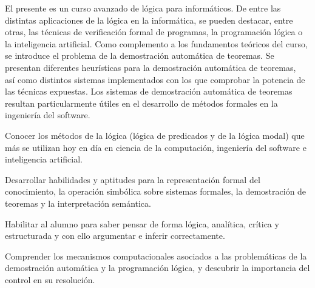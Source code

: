 \begin{syllabus}


\begin{justification}
El presente es un curso avanzado de lógica para informáticos. De
entre las distintas aplicaciones de la lógica en la informática, se
pueden destacar, entre otras, las técnicas de verificación formal de
programas, la programación lógica o la inteligencia artificial. Como
complemento a los fundamentos teóricos del curso, se introduce el
problema de la demostración automática de teoremas. Se presentan
diferentes heurísticas para la demostración automática de teoremas,
así­ como distintos sistemas implementados con los que comprobar la
potencia de las técnicas expuestas. Los sistemas de demostración
automática de teoremas resultan particularmente útiles en el
desarrollo de métodos formales en la ingeniería del software.
\end{justification}

\begin{goals}
\item Conocer los métodos de la lógica (lógica de predicados y de la lógica modal) que más se utilizan hoy en día en ciencia de la computación, ingeniería del software e inteligencia artificial. 
\item Desarrollar habilidades y aptitudes para la representación formal del conocimiento, la operación simbólica sobre sistemas formales, la demostración de teoremas y la interpretación semántica.
\item Habilitar al alumno para saber pensar de forma lógica, analítica, crítica y estructurada y con ello argumentar e inferir correctamente.
\item Comprender los mecanismos computacionales asociados a las problemáticas de la demostración automática y la programación lógica, y descubrir la importancia del control en su resolución.
\end{goals}

\begin{outcomes}
\end{outcomes}


\end{syllabus}
